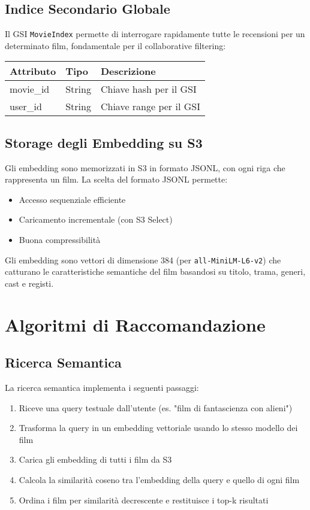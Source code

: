 \documentclass[11pt,a4paper]{article}
\begin{document}
\subsection{Indice Secondario Globale}
Il GSI \texttt{MovieIndex} permette di interrogare rapidamente tutte le recensioni per un determinato film, fondamentale per il collaborative filtering:

\begin{center}
\begin{tabular}{lll}
\toprule
\textbf{Attributo} & \textbf{Tipo} & \textbf{Descrizione} \\
\midrule
movie\_id & String & Chiave hash per il GSI \\
user\_id & String & Chiave range per il GSI \\
\bottomrule
\end{tabular}
\end{center}

\subsection{Storage degli Embedding su S3}
Gli embedding sono memorizzati in S3 in formato JSONL, con ogni riga che rappresenta un film. La scelta del formato JSONL permette:

\begin{itemize}
  \item Accesso sequenziale efficiente
  \item Caricamento incrementale (con S3 Select)
  \item Buona compressibilità
\end{itemize}

Gli embedding sono vettori di dimensione 384 (per \texttt{all-MiniLM-L6-v2}) che catturano le caratteristiche semantiche del film basandosi su titolo, trama, generi, cast e registi.

\section{Algoritmi di Raccomandazione}
\subsection{Ricerca Semantica}
La ricerca semantica implementa i seguenti passaggi:

\begin{enumerate}
  \item Riceve una query testuale dall'utente (es. "film di fantascienza con alieni")
  \item Trasforma la query in un embedding vettoriale usando lo stesso modello dei film
  \item Carica gli embedding di tutti i film da S3
  \item Calcola la similarità coseno tra l'embedding della query e quello di ogni film
  \item Ordina i film per similarità decrescente e restituisce i top-k risultati
\end{enumerate}
\end{document}
